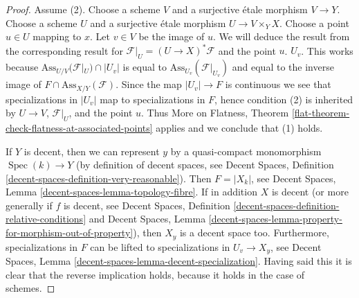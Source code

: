 \documentclass[10pt,a4paper]{amsart}
\theoremstyle{plain}
\theoremstyle{definition}
\theoremstyle{remark}
\numberwithin{equation}{subsection}
\def\Spec{\mathop{\mathrm{Spec}}}
\begin{document}
\begin{proof}
Assume (2).
Choose a scheme $V$ and a surjective \'etale morphism $V \to Y$.
Choose a scheme $U$ and a surjective \'etale morphism $U \to V \times_Y X$.
Choose a point $u \in U$ mapping to $x$. Let $v \in V$ be the image of $u$.
We will deduce the result from the corresponding result for
$\mathcal{F}|_U = (U \to X)^*\mathcal{F}$ and the point $u$.
$U_v$. This works because $\text{Ass}_{U/V}(\mathcal{F}|_U) \cap |U_v|$
is equal to $\text{Ass}_{U_v}(\mathcal{F}|_{U_v})$ and equal to the inverse
image of $F \cap \text{Ass}_{X/Y}(\mathcal{F})$.
Since the map $|U_v| \to F$ is continuous we see that
specializations in $|U_v|$ map to specializations in $F$,
hence condition (2) is inherited by $U \to V$,
$\mathcal{F}|_U$, and the point $u$.
Thus More on Flatness, Theorem
\ref{flat-theorem-check-flatness-at-associated-points} applies
and we conclude that (1) holds.

\medskip\noindent
If $Y$ is decent, then we can represent
$y$ by a quasi-compact monomorphism $\Spec(k) \to Y$
(by definition of decent spaces, see
Decent Spaces, Definition \ref{decent-spaces-definition-very-reasonable}).
Then $F = |X_k|$, see
Decent Spaces, Lemma \ref{decent-spaces-lemma-topology-fibre}.
If in addition $X$ is decent (or more generally if $f$ is decent, see
Decent Spaces, Definition \ref{decent-spaces-definition-relative-conditions}
and Decent Spaces, Lemma
\ref{decent-spaces-lemma-property-for-morphism-out-of-property}),
then $X_y$ is a decent space too. Furthermore, specializations in
$F$ can be lifted to specializations
in $U_v \to X_y$, see
Decent Spaces, Lemma \ref{decent-spaces-lemma-decent-specialization}.
Having said this it is clear that the reverse implication
holds, because it holds in the case of schemes.
\end{proof}
\end{document}
